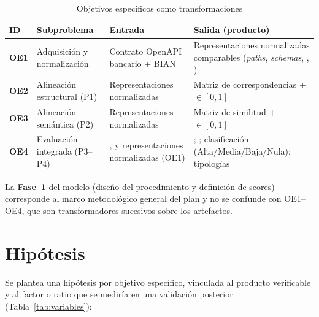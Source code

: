 \begin{table}[H]
  \centering
  \caption{Objetivos específicos como transformaciones}
  \label{tab:objetivos-especificos}
  \small
  \begin{tabular}{@{}p{}p{}p{}p{}@{}}
    \toprule
    \textbf{ID} & \textbf{Subproblema} & \textbf{Entrada} & \textbf{Salida (producto)} \\
    \midrule
    \textbf{OE1} &
    Adquisición y normalización &
    Contrato OpenAPI bancario + \ServiceDomain{} BIAN &
    Representaciones normalizadas comparables (\textit{paths}, \textit{schemas},
    \Behavior{}, \BusinessObject{}) \\
    \textbf{OE2} &
    Alineación estructural (P1) &
    Representaciones normalizadas &
    Matriz de correspondencias + \StructuralScore{} $\in [0, 1]$ \\
    \textbf{OE3} &
    Alineación semántica (P2) &
    Representaciones normalizadas &
    Matriz de similitud + \SemanticScore{} $\in [0, 1]$ \\
    \textbf{OE4} &
    Evaluación integrada (P3--P4) &
    \StructuralScore{}, \SemanticScore{} y representaciones normalizadas (OE1) &
    \CoverageScore{}; \AlignmentScore{}; clasificación (Alta/Media/Baja/Nula); tipologías \\
    \bottomrule
  \end{tabular}
\end{table}

La \textbf{Fase~1} del modelo (diseño del procedimiento y definición de scores) corresponde al
marco metodológico general del plan y no se confunde con OE1--OE4, que son
transformadores sucesivos sobre los artefactos.

\section{Hipótesis}

Se plantea una hipótesis por objetivo específico, vinculada al producto verificable y al factor o
ratio que se mediría en una validación posterior (Tabla~\ref{tab:variables}):


